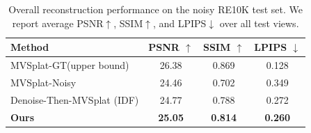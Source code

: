 \begin{table}
  \centering
  \caption{%
    Overall reconstruction performance on the noisy RE10K test set. 
    We report average PSNR$\uparrow$, SSIM$\uparrow$, and LPIPS$\downarrow$ over all test views.
  }
  \label{tab:overall_results}
  \begin{tabular}{lccc}
    \toprule
    Method & PSNR $\uparrow$ & SSIM $\uparrow$ & LPIPS $\downarrow$ \\
    \midrule
    MVSplat-GT(upper bound)    & 26.38 & 0.869 & 0.128 \\
    MVSplat-Noisy              & 24.46 & 0.702 & 0.349 \\
    Denoise-Then-MVSplat (IDF) & 24.77 & 0.788 & 0.272 \\
    \textbf{Ours}              & \textbf{25.05} & \textbf{0.814} & \textbf{0.260} \\
    \bottomrule
  \end{tabular}
\end{table}
